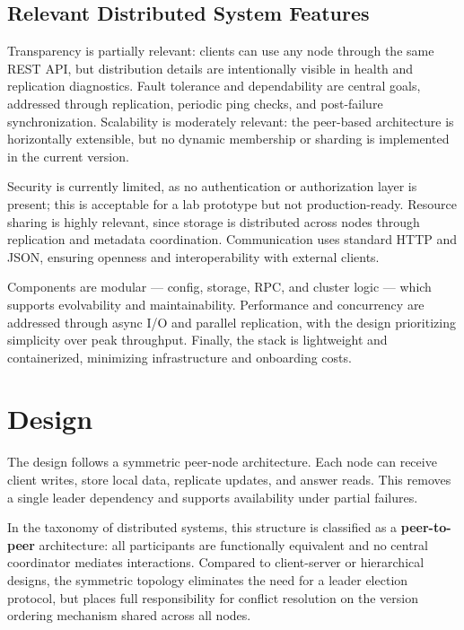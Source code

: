\documentclass{scrartcl}
\begin{document}
\subsection{Relevant Distributed System Features}
\label{ds-features}

Transparency is partially relevant: clients can use any node through the same REST API, but distribution details are intentionally visible in health and replication diagnostics. Fault tolerance and dependability are central goals, addressed through replication, periodic ping checks, and post-failure synchronization. Scalability is moderately relevant: the peer-based architecture is horizontally extensible, but no dynamic membership or sharding is implemented in the current version.

Security is currently limited, as no authentication or authorization layer is present; this is acceptable for a lab prototype but not production-ready. Resource sharing is highly relevant, since storage is distributed across nodes through replication and metadata coordination. Communication uses standard HTTP and JSON, ensuring openness and interoperability with external clients.

Components are modular --- config, storage, RPC, and cluster logic --- which supports evolvability and maintainability. Performance and concurrency are addressed through async I/O and parallel replication, with the design prioritizing simplicity over peak throughput. Finally, the stack is lightweight and containerized, minimizing infrastructure and onboarding costs.

\section{Design}\label{design}

The design follows a symmetric peer-node architecture. Each node can receive client writes, store local data, replicate updates, and answer reads. This removes a single leader dependency and supports availability under partial failures.

In the taxonomy of distributed systems, this structure is classified as a \textbf{peer-to-peer} architecture: all participants are functionally equivalent and no central coordinator mediates interactions. Compared to client-server or hierarchical designs, the symmetric topology eliminates the need for a leader election protocol, but places full responsibility for conflict resolution on the version ordering mechanism shared across all nodes.
\end{document}

